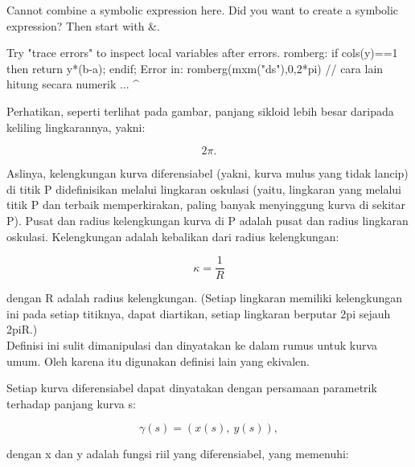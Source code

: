 \documentclass{article}
\begin{document}
\begin{eulernotebook}
\begin{eulercomment}
\begin{eulercomment}
\begin{eulercomment}
\begin{eulercomment}
\begin{eulercomment}
\begin{eulercomment}
\begin{euleroutput}
  Cannot combine a symbolic expression here.
  Did you want to create a symbolic expression?
  Then start with &.
  
  Try "trace errors" to inspect local variables after errors.
  romberg:
      if cols(y)==1 then return y*(b-a); endif;
  Error in:
  romberg(mxm("ds"),0,2*pi) // cara lain hitung secara numerik ...
                           ^
\end{euleroutput}
\begin{eulercomment}
Perhatikan, seperti terlihat pada gambar, panjang sikloid lebih besar daripada keliling lingkarannya, yakni:

\end{eulercomment}
\begin{eulerformula}
\[
2\pi.
\]
\end{eulerformula}
\begin{eulercomment}
\end{eulercomment}
\begin{eulercomment}
Aslinya, kelengkungan kurva diferensiabel (yakni, kurva mulus yang tidak lancip) di titik P didefinisikan melalui lingkaran
oskulasi (yaitu, lingkaran yang melalui titik P dan terbaik memperkirakan, paling banyak menyinggung kurva di sekitar P). Pusat
dan radius kelengkungan kurva di P adalah pusat dan radius lingkaran oskulasi. Kelengkungan adalah kebalikan dari radius
kelengkungan:

\end{eulercomment}
\begin{eulerformula}
\[
\kappa =\frac {1}{R}
\]
\end{eulerformula}
\begin{eulercomment}
dengan R adalah radius kelengkungan. (Setiap lingkaran memiliki kelengkungan ini pada setiap titiknya, dapat diartikan, setiap
lingkaran berputar 2pi sejauh 2piR.)\\
Definisi ini sulit dimanipulasi dan dinyatakan ke dalam rumus untuk kurva umum. Oleh karena itu digunakan definisi lain yang
ekivalen.

\end{eulercomment}
\begin{eulercomment}
Setiap kurva diferensiabel dapat dinyatakan dengan persamaan parametrik terhadap panjang kurva s:

\end{eulercomment}
\begin{eulerformula}
\[
\gamma(s) = (x(s),\ y(s)),
\]
\end{eulerformula}
\begin{eulercomment}
dengan x dan y adalah fungsi riil yang diferensiabel, yang memenuhi:


\end{eulercomment}
\end{eulercomment}
\end{eulercomment}
\end{eulercomment}
\end{eulercomment}
\end{eulercomment}
\end{eulercomment}
\end{eulernotebook}
\end{document}
